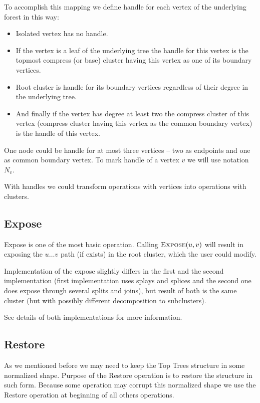 To accomplish this mapping we define {\I handle} for each vertex of the
underlying forest in this way:

\begin{itemize}
\item Isolated vertex has no handle.
\item If the vertex is a leaf of the underlying tree the
handle for this vertex is the topmost compress (or base) cluster having this
vertex as one of its boundary vertices.
\item Root cluster is handle for its boundary vertices regardless of their
degree in the underlying tree.
\item And finally if the vertex has degree at least two the compress cluster of
this vertex (compress cluster having this vertex as the common boundary vertex)
is the handle of this vertex.
\end{itemize}

One node could be handle for at most three vertices -- two as endpoints and one
as common boundary vertex. To mark handle of a vertex $v$ we will use notation
$N_v$.

With handles we could transform operations with vertices into operations with
clusters.

\subsection{Expose}

Expose is one of the most basic operation. Calling $\hbox{\sc Expose}(u,v)$ will result in
exposing the $u\dots v$ path (if exists) in the root cluster, which the user
could modify.

Implementation of the expose slightly differs in the first and the second
implementation (first implementation uses splays and splices and the second one
does expose through several splits and joins), but result of both is the
same cluster (but with possibly different decomposition to subclusters).

See details of both implementations for more information.

\subsection{Restore}

As we mentioned before we may need to keep the Top Trees structure in some
normalized shape. Purpose of the Restore operation is to restore the structure
in such form. Because some operation may corrupt this normalized shape we
use the Restore operation at beginning of all others operations.

